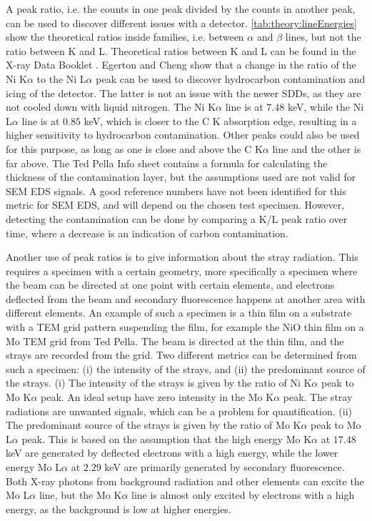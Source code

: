 A peak ratio, i.e. the counts in one peak divided by the counts in another peak, can be used to discover different issues with a detector.
\cref{tab:theory:lineEnergies} show the theoretical ratios inside families, i.e. between $\alpha$ and $\beta$ lines, but not the ratio between K and L.
Theoretical ratios between K and L can be found in the X-ray Data Booklet \cite{thompson_x-ray_2004}.
Egerton and Cheng \cite{egerton_nio_characterization_1994} show that a change in the ratio of the Ni K$\alpha$ to the Ni L$\alpha$ peak can be used to discover hydrocarbon contamination and icing of the detector.
The latter is not an issue with the newer SDDs, as they are not cooled down with liquid nitrogen.
The Ni K$\alpha$ line is at $7.48$ keV, while the Ni L$\alpha$ line is at 0$.85$ keV, which is closer to the C K absorption edge, resulting in a higher sensitivity to hydrocarbon contamination.
Other peaks could also be used for this purpose, as long as one is close and above the C K$\alpha$ line and the other is far above.
The Ted Pella Info sheet \cite{ted_pella_nio_tem_2019} contains a formula for calculating the thickness of the contamination layer, but the assumptions used are not valid for SEM EDS signals.
A good reference numbers have not been identified for this metric for SEM EDS, and will depend on the chosen test specimen.
However, detecting the contamination can be done by comparing a K/L peak ratio over time, where a decrease is an indication of carbon contamination.


Another use of peak ratios is to give information about the stray radiation.
This requires a specimen with a certain geometry, more specifically a specimen where the beam can be directed at one point with certain elements, and electrons deflected from the beam and secondary fluorescence happens at another area with different elements.
An example of such a specimen is a thin film on a substrate with a TEM grid pattern suspending the film, for example the NiO thin film on a Mo TEM grid from Ted Pella.
The beam is directed at the thin film, and the strays are recorded from the grid.
Two different metrics can be determined from such a specimen: (i) the intensity of the strays, and (ii) the predominant source of the strays.
(i) The intensity of the strays is given by the ratio of Ni K$\alpha$ peak to Mo K$\alpha$ peak.
An ideal setup have zero intensity in the Mo K$\alpha$ peak.
The stray radiations are unwanted signals, which can be a problem for quantification.
(ii) The predominant source of the strays is given by the ratio of Mo K$\alpha$ peak to Mo L$\alpha$ peak.
This is based on the assumption that the high energy Mo K$\alpha$ at $17.48$ keV are generated by deflected electrons with a high energy, while the lower energy Mo L$\alpha$ at $2.29$ keV are primarily generated by secondary fluorescence.
Both X-ray photons from background radiation and other elements can excite the Mo L$\alpha$ line, but the Mo K$\alpha$ line is almost only excited by electrons with a high energy, as the background is low at higher energies.




